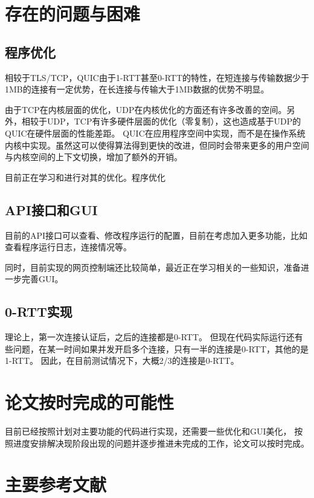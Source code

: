 \vspace{8mm}
\section{存在的问题与困难}

\vspace{3mm}
\subsection{程序优化}
相较于TLS/TCP，QUIC由于1-RTT甚至0-RTT的特性，在短连接与传输数据少于1MB的连接有一定优势，在长连接与传输大于1MB数据的优势不明显。

由于TCP在内核层面的优化，UDP在内核优化的方面还有许多改善的空间。另外，相较于UDP，TCP有许多硬件层面的优化（零复制），这也造成基于UDP的QUIC在硬件层面的性能差距。
QUIC在应用程序空间中实现，而不是在操作系统内核中实现。虽然这可以使得算法得到更快的改进，但同时会带来更多的用户空间与内核空间的上下文切换，增加了额外的开销。

目前正在学习和进行对其的优化。程序优化

\vspace{3mm}
\subsection{API接口和GUI}
目前的API接口可以查看、修改程序运行的配置，目前在考虑加入更多功能，比如查看程序运行日志，连接情况等。

同时，目前实现的网页控制端还比较简单，最近正在学习相关的一些知识，准备进一步完善GUI。


\vspace{3mm}
\subsection{0-RTT实现}
理论上，第一次连接认证后，之后的连接都是0-RTT。
但现在代码实际运行还有些问题，在某一时间如果并发开启多个连接，只有一半的连接是0-RTT，其他的是1-RTT。
因此，在目前测试情况下，大概2/3的连接是0-RTT。

\vspace{8mm}
\section{论文按时完成的可能性}
目前已经按照计划对主要功能的代码进行实现，还需要一些优化和GUI美化，
按照进度安排解决现阶段出现的问题并逐步推进未完成的工作，论文可以按时完成。 

\vspace{8mm}
\section{主要参考文献}




